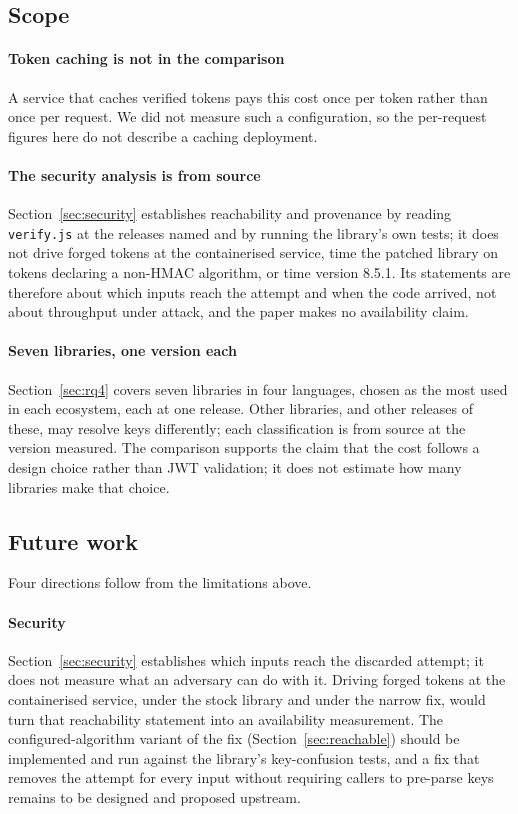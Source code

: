 \documentclass[preprint,12pt,authoryear]{elsarticle}
\begin{document}
\subsection{Scope}\label{sec:threats-scope}

\paragraph{Token caching is not in the comparison} A service that caches
verified tokens pays this cost once per token rather than once per request. We
did not measure such a configuration, so the per-request figures here do not
describe a caching deployment.

\paragraph{The security analysis is from source} Section~\ref{sec:security}
establishes reachability and provenance by reading \texttt{verify.js} at the
releases named and by running the library's own tests; it does not drive
forged tokens at the containerised service, time the patched library on tokens
declaring a non-HMAC algorithm, or time version 8.5.1. Its statements are
therefore about which inputs reach the attempt and when the code arrived, not
about throughput under attack, and the paper makes no availability claim.

\paragraph{Seven libraries, one version each} Section~\ref{sec:rq4} covers
seven libraries in four languages, chosen as the most used in each ecosystem,
each at one release. Other libraries, and other releases of these, may resolve
keys differently; each classification is from source at the version measured.
The comparison supports the claim that the cost follows a design choice rather
than JWT validation; it does not estimate how many libraries make that
choice.

\subsection{Future work}\label{sec:future}

Four directions follow from the limitations above.

\paragraph{Security} Section~\ref{sec:security} establishes which inputs reach
the discarded attempt; it does not measure what an adversary can do with it.
Driving forged tokens at the containerised service, under the stock library and under
the narrow fix, would turn that reachability statement into an availability
measurement. The configured-algorithm variant of the fix
(Section~\ref{sec:reachable}) should be implemented and run against the
library's key-confusion tests, and a fix that removes the attempt for every
input without requiring callers to pre-parse keys remains to be designed and
proposed upstream.
\end{document}
